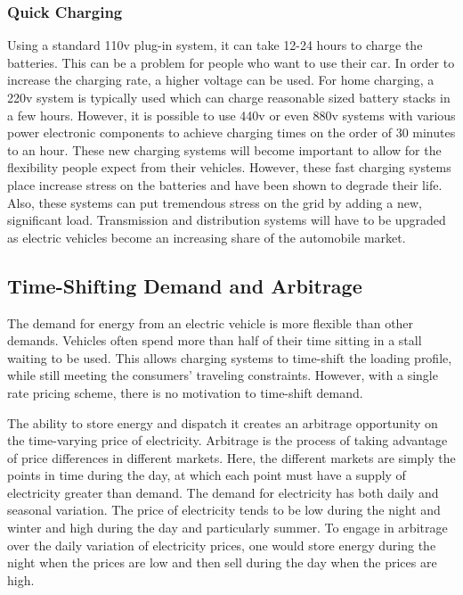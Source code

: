 \subsubsection{Quick Charging}
Using a standard 110v plug-in system, it can take 12-24 hours to charge the batteries.  This can be a problem for people who want to use their car.  	In order to increase the charging rate, a higher voltage can be used.  For home charging, a 220v system is typically used which can charge reasonable sized battery stacks in a few hours.  However, it is possible to use 440v or even 880v systems with various power electronic components to achieve charging times on the order of 30 minutes to an hour.  These new charging systems will become important to allow for the flexibility people expect from their vehicles.  However, these fast charging systems place increase stress on the batteries and have been shown to degrade their life.  Also, these systems can put tremendous stress on the grid by adding a new, significant load.  Transmission and distribution systems will have to be upgraded as electric vehicles become an increasing share of the automobile market.    


\subsection{Time-Shifting Demand and Arbitrage}
The demand for energy from an electric vehicle is more flexible than other demands.  Vehicles often spend more than half of their time sitting in a stall waiting to be used.  This allows charging systems to time-shift the loading profile, while still meeting the consumers' traveling constraints.  However, with a single rate pricing scheme, there is no motivation to time-shift demand.

The ability to store energy and dispatch it creates an arbitrage opportunity on the time-varying price of electricity.  Arbitrage is the process of taking advantage of price differences in different markets.  Here, the different markets are simply the points in time during the day, at which each point must have a supply of electricity greater than demand.  The demand for electricity has both daily and seasonal variation.  The price of electricity tends to be low during the night and winter and high during the day and particularly summer.  To engage in arbitrage over the daily variation of electricity prices, one would store energy during the night when the prices are low and then sell during the day when the prices are high.  

